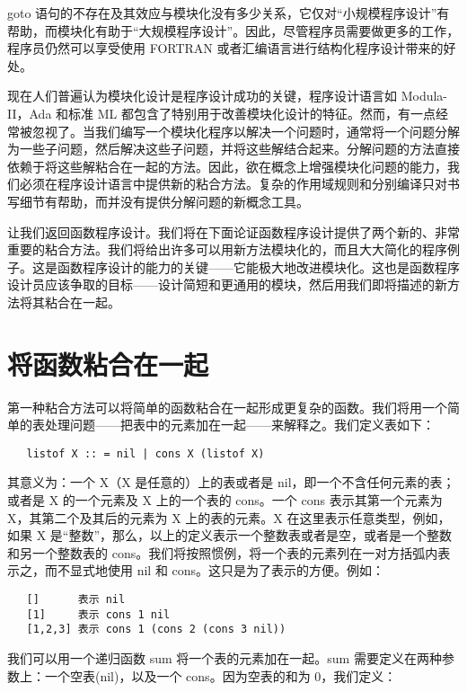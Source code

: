 \documentclass[12pt,a4paper]{article}
\begin{document}
goto 语句的不存在及其效应与模块化没有多少关系，它仅对``小规模程序设计''有帮助，而模块化有助于``大规模程序设计''。因此，尽管程序员需要做更多的工作，程序员仍然可以享受使用 FORTRAN 或者汇编语言进行结构化程序设计带来的好处。

现在人们普遍认为模块化设计是程序设计成功的关键，程序设计语言如 Modula-II\cite[Wir82]{Wir82}，Ada\cite[oD80]{oD80} 和标准 ML 都包含了特别用于改善模块化设计的特征。然而，有一点经常被忽视了。当我们编写一个模块化程序以解决一个问题时，通常将一个问题分解为一些子问题，然后解决这些子问题，并将这些解结合起来。分解问题的方法直接依赖于将这些解粘合在一起的方法。因此，欲在概念上增强模块化问题的能力，我们必须在程序设计语言中提供新的粘合方法。复杂的作用域规则和分别编译只对书写细节有帮助，而并没有提供分解问题的新概念工具。

让我们返回函数程序设计。我们将在下面论证函数程序设计提供了两个新的、非常重要的粘合方法。我们将给出许多可以用新方法模块化的，而且大大简化的程序例子。这是函数程序设计的能力的关键——它能极大地改进模块化。这也是函数程序设计员应该争取的目标——设计简短和更通用的模块，然后用我们即将描述的新方法将其粘合在一起。

\section{将函数粘合在一起}

第一种粘合方法可以将简单的函数粘合在一起形成更复杂的函数。我们将用一个简单的表处理问题——把表中的元素加在一起——来解释之。我们定义表如下：

\begin{verbatim}
   listof X :: = nil | cons X (listof X)
\end{verbatim}

其意义为：一个 X（X 是任意的）上的表或者是 nil，即一个不含任何元素的表；或者是 X 的一个元素及 X 上的一个表的 cons。一个 cons 表示其第一个元素为 X，其第二个及其后的元素为 X 上的表的元素。X 在这里表示任意类型，例如，如果 X 是``整数''，那么，以上的定义表示一个整数表或者是空，或者是一个整数和另一个整数表的 cons。我们将按照惯例，将一个表的元素列在一对方括弧内表示之，而不显式地使用 nil 和 cons。这只是为了表示的方便。例如：

\begin{verbatim}
   []      表示 nil
   [1]     表示 cons 1 nil
   [1,2,3] 表示 cons 1 (cons 2 (cons 3 nil))
\end{verbatim}

我们可以用一个递归函数 sum 将一个表的元素加在一起。sum 需要定义在两种参数上：一个空表(nil)，以及一个 cons。因为空表的和为 0，我们定义：
\end{document}

